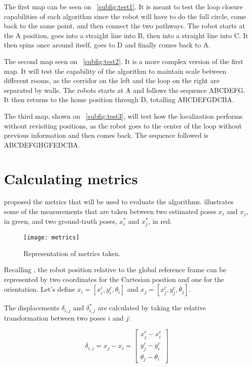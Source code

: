 The first map can be seen on \figurename~\ref{subfig:test1}. It is meant to test the loop closure capabilities of each algorithm since the robot will have to do the full circle, come back to the same point, and then connect the two pathways. The robot starts at the A position, goes into a straight line into B, then into a straight line into C. It then spins once around itself, goes to D and finally comes back to A.

The second map seen on \figurename~\ref{subfig:test2}. It is a more complex version of the first map. It will test the capability of the algorithm to maintain scale between different rooms, as the corridor on the left and the loop on the right are separated by walls. The robots starts at A and follows the sequence ABCDEFG. It then returns to the home position through D, totalling ABCDEFGDCBA.

The third map, shown on \figurename~\ref{subfig:test3}, will test how the localization performs without revisiting positions, as the robot goes to the center of the loop without previous information and then comes back. The sequence followed is ABCDEFGHGFEDCBA.

\section{Calculating metrics} \label{sec:metrics}

 proposed the metrics that will be used to evaluate the algorithms.  illustrates some of the measurements that are taken between two estimated poses $x_i$ and $x_j$, in green, and two ground-truth poses, $x_i^*$ and $x_j^*$, in red.

\begin{figure}[!ht]
    \centering
    \texttt{[image: metrics]}
    \caption{Representation of metrics taken.}
    \label{fig:metrics}
\end{figure}

Recalling , the robot position relative to the global reference frame can be represented by two coordinates for the Cartesian position and one for the orientation. Let's define $x_i = [x^c_i, y^c_i, \theta_i]$ and $x_j = [x^c_j, y^c_j, \theta_j]$.

The displacements $\delta_{i,j}$ and $\delta_{i,j}^*$ are calculated by taking the relative transformation between two poses $i$ and $j$:

\begin{equation}
\delta_{i,j} = x_j - x_i =
\begin{bmatrix}
x^c_j - x^c_i \\
y^c_j - y^c_i \\
\theta_j - \theta_i
\end{bmatrix}
\end{equation}

